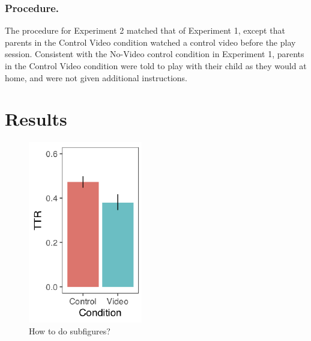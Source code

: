 \documentclass[10pt, letterpaper]{article}
\newenvironment{CodeChunk}{}{}
\begin{document}
\subsubsection{Procedure.}\label{procedure.-1}

The procedure for Experiment 2 matched that of Experiment 1, except that
parents in the Control Video condition watched a control video before
the play session. Consistent with the No-Video control condition in
Experiment 1, parents in the Control Video condition were told to play
with their child as they would at home, and were not given additional
instructions.

\section{Results}\label{results-1}

\begin{CodeChunk}
\begin{figure}[H]

{\centering \includegraphics{figs/e2TTR-1} 

}

\caption[How to do subfigures?]{How to do subfigures?}\label{fig:e2TTR}
\end{figure}
\end{CodeChunk}
\end{document}
